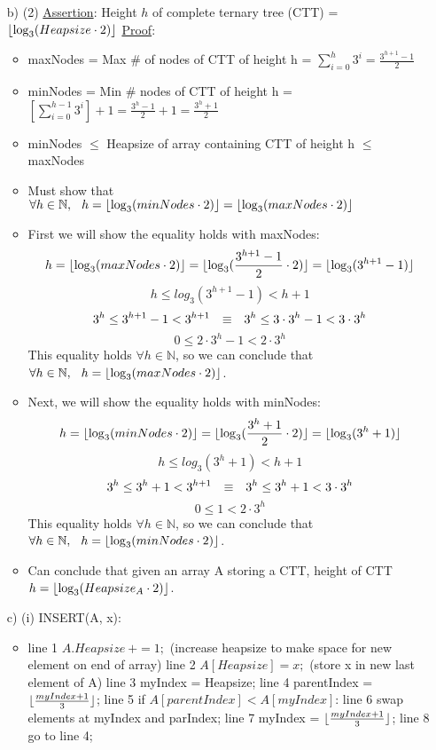 \documentclass[12pt, oneside]{article}
\DeclarePairedDelimiter\floor{\lfloor}{\rfloor}
\newcommand\tab[1][0.25cm]{\hspace*{#1}}
\begin{document}
\begin{itemize}
\item [b) (2)] \underline{Assertion}: Height $h$ of complete ternary tree (CTT) = $\floor{\log_{3}(Heapsize\cdot2)}$ \newline
	\underline{Proof}:
	\begin{itemize}
	\item maxNodes = Max \# of nodes of CTT of height h = $\sum_{i=0}^{h}3^i = \frac{3^{h+1}-1}{2}$
	\item minNodes = Min \# nodes of CTT of height h = $[\sum_{i=0}^{h-1}3^i]+1 = \frac{3^{h}-1}{2}+1 = \frac{3^{h}+1}{2} $
	\item minNodes $\leq$ Heapsize of array containing CTT of height h $\leq$ maxNodes
	\item Must show that $\forall h \in \mathbb{N},\tab h=\floor{\log_{3}(minNodes\cdot2)}=\floor{\log_{3}(maxNodes\cdot2)}$ \newpage
	\item	First we will show the equality holds with maxNodes:
	$$ h=\floor{\log_{3}(maxNodes\cdot2)}=\floor{\log_{3}(\frac{3^{h+1}-1}{2}\cdot2)} = \floor{\log_{3}(3^{h+1}-1)}$$
	$$ h \leq log_{3}(3^{h+1}-1) < h+1$$
	$$ 3^h \leq 3^{h+1}-1 < 3^{h+1}  \tab\equiv\tab 3^h \leq 3\cdot 3^h-1 < 3\cdot 3^h$$
	$$ 0 \leq 2\cdot 3^h-1 < 2\cdot 3^h $$
	This equality holds $\forall h \in \mathbb{N}$, so we can conclude that $\forall h \in \mathbb{N},\tab h=\floor{\log_{3}(maxNodes\cdot2)}$.
	\item Next, we will show the equality holds with minNodes:
	$$ h=\floor{\log_{3}(minNodes\cdot2)}=\floor{\log_{3}(\frac{3^{h}+1}{2}\cdot2)}=\floor{\log_{3}(3^{h}+1)} $$
	$$ h \leq log_{3}(3^{h}+1) < h+1 $$
	$$ 3^h \leq 3^{h}+1 < 3^{h+1}  \tab\equiv\tab 3^h \leq  3^h+1 < 3\cdot 3^h$$
	$$ 0 \leq 1< 2\cdot 3^h $$
	This equality holds $\forall h \in \mathbb{N}$, so we can conclude that $\forall h \in \mathbb{N},\tab h=\floor{\log_{3}(minNodes\cdot2)}$.
	\item Can conclude that given an array A storing a CTT, height of CTT $h = \floor{\log_{3}(Heapsize_A\cdot2)}$.
	\end{itemize}

\item [c) (i)]  
	\tab[0.75cm]INSERT(A, x): 
	\begin{itemize}
	\item line 1 \tab	$A.Heapsize \: += 1;$ \tab\tab  (increase heapsize to make space for new element on end of array)\newline
	line 2 \tab	$A[Heapsize] = x;$ \tab\tab\tab  (store x in new last element of A)\newline	
	line 3 \tab myIndex = Heapsize; \newline
	line 4 \tab	parentIndex = $\floor{\frac{myIndex+1}{3}}$; \newline
	line 5 \tab	if $A[parentIndex] < A[myIndex]$: \newline
	line 6 \tab[0.75cm]	swap elements at myIndex and parIndex; \newline
	line 7 \tab[0.75cm]	myIndex = $\floor{\frac{myIndex+1}{3}}$; \newline
	line 8 \tab[0.75cm]	go to line 4; \newline


\end{itemize}
\end{itemize}
\end{document}
